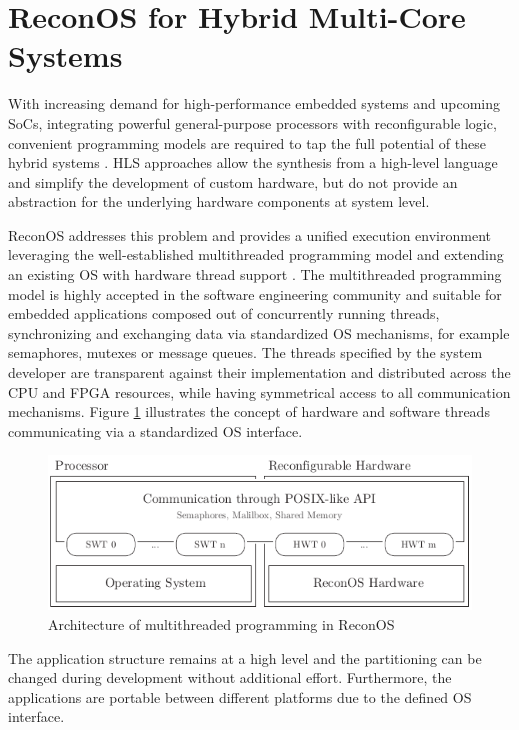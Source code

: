 \section{ReconOS for Hybrid Multi-Core Systems}
With increasing demand for high-performance embedded systems and upcoming
\acp{SoC}, integrating powerful general-purpose processors with reconfigurable
logic, convenient programming models are required to tap the full potential of
these hybrid systems \citep{ANA04,VMB13}. \ac{HLS} approaches allow the
synthesis from a high-level language and simplify the development of custom
hardware, but do not provide an abstraction for the underlying hardware
components at system level.

ReconOS addresses this problem and provides a unified execution environment
leveraging the well-established multithreaded programming model and extending
an existing \ac{OS} with hardware thread support \citep{AHK14}. The
multithreaded programming model is highly accepted in the software engineering
community and suitable for embedded applications \citep{ANA04} composed out of
concurrently running threads, synchronizing and exchanging data via
standardized \ac{OS} mechanisms, for example semaphores, mutexes or message
queues. The threads specified by the system developer are transparent against
their implementation and distributed across the \ac{CPU} and \ac{FPGA}
resources, while having symmetrical access to all communication mechanisms.
Figure \ref{fig:reconos_model} illustrates the concept of hardware and
software threads communicating via a standardized \ac{OS} interface.
\begin{figure}[tb]
	\centering
	\includegraphics{../figures/reconos_model}
	\caption{Architecture of multithreaded programming in ReconOS}
	\label{fig:reconos_model}
\end{figure}
The application structure remains at a high level and the partitioning can be
changed during development without additional effort. Furthermore, the
applications are portable between different platforms due to the defined
\ac{OS} interface.

